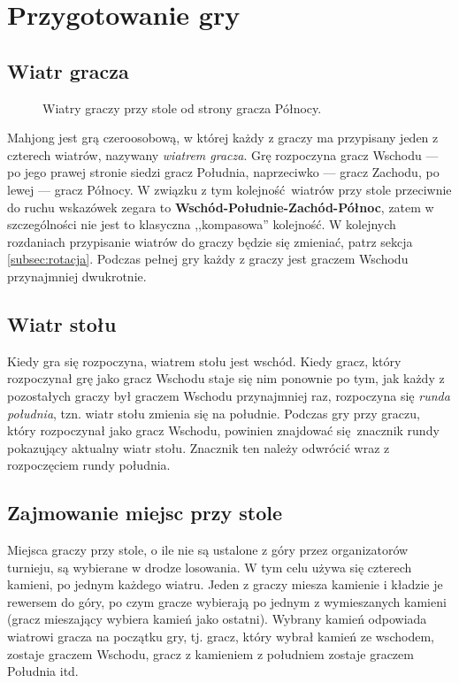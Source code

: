 \newpage
\section{Przygotowanie gry}

\subsection{Wiatr gracza}
\begin{figure}[h]
    \centering
    
    \caption{Wiatry graczy przy stole od strony gracza Północy.}
\end{figure}
Mahjong jest grą czeroosobową, w której każdy z graczy ma przypisany jeden z
czterech wiatrów, nazywany \emph{wiatrem gracza}.
Grę rozpoczyna gracz Wschodu --- po jego prawej stronie siedzi gracz Południa,
naprzeciwko --- gracz Zachodu, po lewej --- gracz Północy.
W związku z tym kolejność wiatrów przy stole przeciwnie do ruchu wskazówek
zegara to \textbf{Wschód-Południe-Zachód-Północ}, zatem w szczególności nie jest
to klasyczna ,,kompasowa'' kolejność.
W kolejnych rozdaniach przypisanie wiatrów do graczy będzie się zmieniać, patrz
sekcja \ref{subsec:rotacja}.
Podczas pełnej gry każdy z graczy jest graczem Wschodu przynajmniej dwukrotnie.

\subsection{Wiatr stołu}
Kiedy gra się rozpoczyna, wiatrem stołu jest wschód.
Kiedy gracz, który rozpoczynał grę jako gracz Wschodu staje się nim ponownie po
tym, jak każdy z pozostałych graczy był graczem Wschodu przynajmniej raz,
rozpoczyna się \emph{runda południa}, tzn. wiatr stołu zmienia się na południe.
Podczas gry przy graczu, który rozpoczynał jako gracz Wschodu, powinien
znajdować się znacznik rundy pokazujący aktualny wiatr stołu.
Znacznik ten należy odwrócić wraz z rozpoczęciem rundy południa.

\subsection{Zajmowanie miejsc przy stole}
Miejsca graczy przy stole, o ile nie są ustalone z góry przez organizatorów
turnieju, są wybierane w drodze losowania.
W tym celu używa się czterech kamieni, po jednym każdego wiatru.
Jeden z graczy miesza kamienie i kładzie je rewersem do góry, po czym gracze
wybierają po jednym z wymieszanych kamieni (gracz mieszający wybiera
kamień jako ostatni).
Wybrany kamień odpowiada wiatrowi gracza na początku gry, tj. gracz, który
wybrał kamień ze wschodem, zostaje graczem Wschodu, gracz z kamieniem z
południem zostaje graczem Południa itd.

